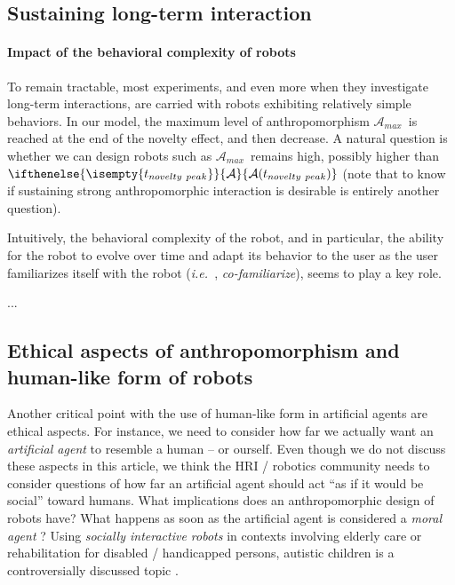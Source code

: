 \documentclass{frontiersSCNS} %
\newcommand{\ie}{{\textit{i.e.~}}}
\newcommand{\ant}[1][]{%
      \ifthenelse{\isempty{#1}}%
        {\mathcal{A}}
        {\mathcal{A}(#1)}
}
\newcommand{\AntMax}{{$\mathcal{A}_{max}$~}}
\begin{document}
\subsection{Sustaining long-term interaction}

\paragraph{Impact of the behavioral complexity of robots}

To remain tractable, most experiments, and even more when they investigate
long-term interactions, are carried with robots exhibiting relatively simple
behaviors. In our model, the maximum level of anthropomorphism \AntMax is
reached at the end of the novelty effect, and then decrease. A natural question
is whether we can design robots such as \AntMax remains high, possibly higher
than $\ant[t_{novelty~peak}]$ (note that to know if sustaining strong
anthropomorphic interaction is desirable is entirely another question).

Intuitively, the behavioral complexity of the robot, and in particular, the ability
for the robot to evolve over time and adapt its behavior to the user as the user
familiarizes itself with the robot (\ie, \emph{co-familiarize}), seems to play a
key role.

...

\subsection{Ethical aspects of anthropomorphism and human-like form of robots}


Another critical point with the use of human-like form in artificial agents are 
ethical aspects. For instance, we need to consider how far we actually want an 
\textit{artificial agent} to resemble a human -- or ourself. Even though we do not 
discuss these aspects in this article, we think the HRI / robotics community needs 
to consider questions of how far an artificial agent should act ``as if it would be 
social'' toward humans. What implications does an anthropomorphic design of robots 
have? What happens as soon as the artificial agent is considered a \textit{moral 
agent} \cite{sullins_when_2006}? Using \textit{socially interactive robots} in 
contexts involving elderly care or rehabilitation for disabled / handicapped 
persons, autistic children is a controversially discussed topic 
\cite{robins_robots_2005}.
\end{document}
